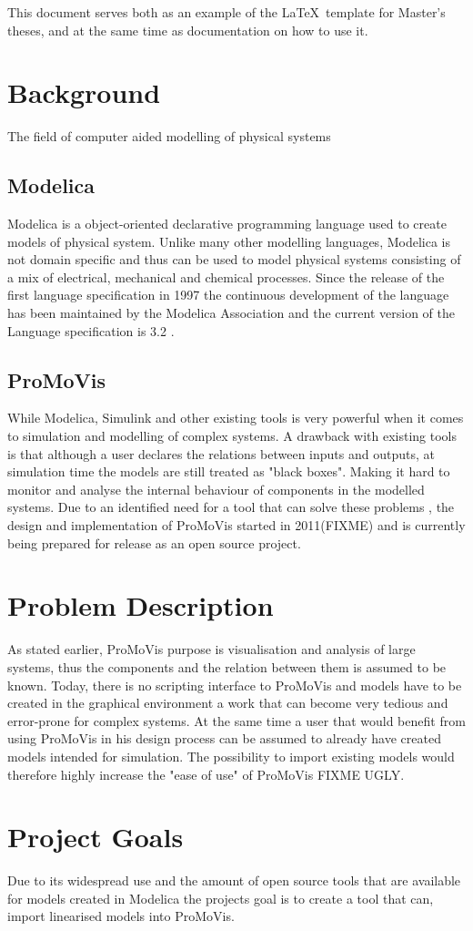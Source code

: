 This document serves both as an example of the \LaTeX\ template
for Master's theses, and at the same time as documentation
on how to use it.

\section{Background}
The field of computer aided modelling of physical systems
\subsection{Modelica}
Modelica is a object-oriented declarative programming language used to create models of physical system. Unlike many other modelling languages, Modelica is not domain specific and thus can be used to model physical systems consisting of a mix of electrical, mechanical and chemical processes. Since the release of the first language specification in 1997 the continuous development of the language has been maintained by the Modelica Association and the current version of the Language specification is 3.2 \cite{ModelicaSpec}.\nocite{*}
\subsection{ProMoVis}
While Modelica, Simulink and other existing tools is very powerful when it comes to simulation and modelling of complex systems. A drawback with existing tools is that although a user declares the relations between inputs and outputs, at simulation time the models are still treated as "black boxes". Making it hard to monitor and analyse the internal behaviour of components in the modelled systems. Due to an identified need for a tool that can solve these problems \cite{ProMoVisPaper}\nocite{*}, the design and implementation of ProMoVis started in 2011(FIXME) and is currently being prepared for release as an open source project.





\section{Problem Description}
As stated earlier, ProMoVis purpose is visualisation and analysis of large systems, thus the components and the relation between them is assumed to be known. Today, there is no scripting interface to ProMoVis and models have to be created in the graphical environment a work that can become very tedious and error-prone for complex systems. At the same time a user that would benefit from using ProMoVis in his design process can be assumed to already have created models intended for simulation. The possibility to import existing models would therefore highly increase the "ease of use" of ProMoVis FIXME UGLY.

\section{Project Goals}

Due to its widespread use and the amount of open source tools that are available for models created in Modelica the projects goal is to create a tool that can, import linearised models into ProMoVis.





